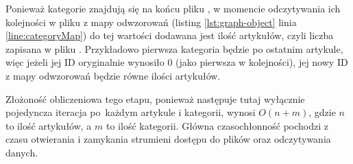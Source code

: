 Ponieważ kategorie znajdują się na końcu pliku , w momencie odczytywania ich kolejności w pliku  z mapy odwzorowań (listing \ref{lst:graph-object} linia \ref{line:categoryMap}) do tej wartości dodawana jest ilość artykułów, czyli liczba zapisana w pliku . Przykładowo pierwsza kategoria będzie po ostatnim artykule, więc jeżeli jej ID oryginalnie wynosiło 0 (jako pierwsza w kolejności), jej nowy ID z mapy odwzorowań będzie równe ilości artykułów.

Złożoność obliczeniowa tego etapu, ponieważ następuje tutaj wyłącznie pojedyncza iteracja po~każdym artykule i kategorii, wynosi $O(n+m)$, gdzie $n$ to ilość artykułów, a $m$ to ilość kategorii. Główna czasochłonność pochodzi z czasu otwierania i zamykania strumieni dostępu do plików oraz odczytywania danych.
